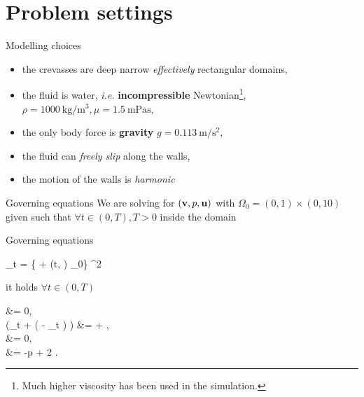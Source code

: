\documentclass[10pt, aspectratio=169, t]{beamer}
\begin{document}
\section{Problem settings}
\begin{frame}{Modelling choices}
	\begin{itemize}
		\item the crevasses are deep narrow \emph{effectively} rectangular domains,
			\vfill
		\item the fluid is water, \textit{i.e.} \textbf{incompressible} Newtonian\footnote{Much higher viscosity has been used in the simulation.}, $\rho = \SI{1000}{\kilogram /\meter^3}, \mu =\SI{1.5}{\milli\pascal  \second}$,
			\vfill
		\item the only body force is \textbf{gravity}  $g = \SI{0.113}{\meter / \second^2}, $
			\vfill
		\item the fluid can \emph{freely slip} along the walls,
			\vfill
		\item the motion of the walls is \emph{harmonic}
			\vfill
	\end{itemize}
\end{frame}

\begin{frame}{Governing equations}
	We are solving for $\left(\vb{v}, p, \vb{u}\right)$ with $\Omega_0 = (0, 1) \times (0, 10)$ given such that $\forall t \in (0, T), T > 0$ inside the domain
	\begin{math-block}{Governing equations}
		\begin{equations}[single,*]
			\Omega_t = \Big\{ + (t, \vb{x}) \mid {} \in \Omega_0\Big\} \subset {}^2
		\end{equations}
		it holds $\forall t \in (0, T)$
		\begin{equations}[columns,*]
			\bigtriangleup {} &= 0, \\
			\rho\left(\partial_t \vb{v} + \left( - \partial_t \right) \vdot \grad {}\right) &=  + \rho {}, \\ 
			 &= 0, \\
			 &= -p  + 2 \mu {}.
		\end{equations}
	\end{math-block}
\end{frame}
\end{document}
